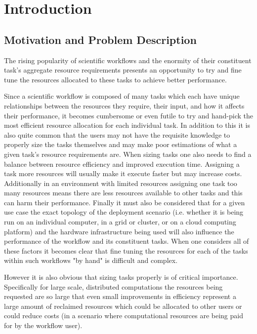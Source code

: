 
\cleardoublepage
\chapter{Introduction}
\label{cha:introduction}

\section{Motivation and Problem Description}
\label{sec:motivation}

The rising popularity of scientific workflows and the enormity of their constituent task's aggregate resource requirements \cite{ResourceProvisioning} presents an opportunity to try and fine tune the resources allocated to these tasks to achieve better performance.

Since a scientific workflow is composed of many tasks which each have unique relationships between the resources they require, their input, and how it affects their performance, it becomes cumbersome or even futile to try and hand-pick the most efficient resource allocation for each individual task. In addition to this it is also quite common that the users may not have the requisite knowledge to properly size the tasks themselves and may make poor estimations \cite{Predictability} of what a given task's resource requirements are. When sizing tasks one also needs to find a balance between resource efficiency and improved execution time. Assigning a task more resources will usually make it execute faster but may increase costs. Additionally in an environment with limited resources assigning one task too many resources means there are less resources available to other tasks and this can harm their performance. Finally it must also be considered that for a given use case the exact topology of the deployment scenario (i.e. whether it is being run on an individual computer, in a grid or cluster, or on a cloud computing platform) and the hardware infrastructure being used will also influence the performance of the workflow and its constituent tasks.  When one considers all of these factors it becomes clear that fine tuning the resources for each of the tasks within such workflows "by hand" is difficult and complex. 

However it is also obvious that sizing tasks properly is of critical importance. Specifically for large scale, distributed computations the resources being requested are so large that even small improvements in efficiency represent a large amount of reclaimed resources which could be allocated to other users or could reduce costs (in a scenario where computational resources are being paid for by the workflow user). 

